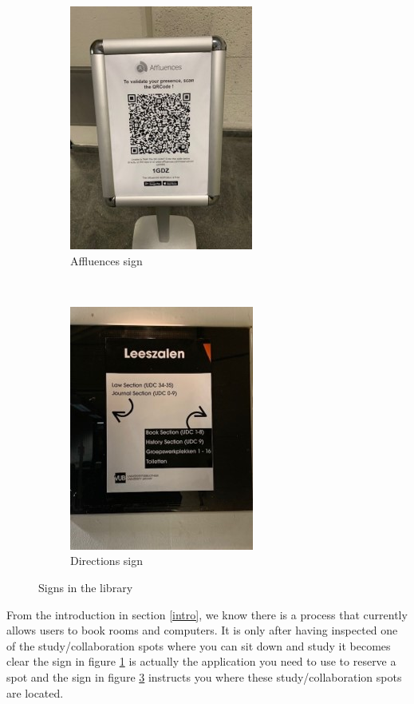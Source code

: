 \documentclass[a4paper, 11pt]{article}
\begin{document}
\begin{figure}[h]
	\centering
	\begin{subfigure}[t]{0.5\textwidth}
		\centering
		\includegraphics[width=0.5\linewidth]{figures/affluences}
		\caption{Affluences sign}
		\label{fig:affluences}
	\end{subfigure}%
	~ 
	\begin{subfigure}[t]{0.5\textwidth}
		\centering
		\includegraphics[width=0.5\linewidth]{figures/directions}
		\caption{Directions sign}
		\label{fig:directions}
	\end{subfigure}
	\caption{Signs in the library}
\end{figure}

From the introduction in section \ref{intro}, we know there is a process that currently allows users to book rooms and computers. It is only after having inspected one of the study/collaboration spots where you can sit down and study it becomes clear the sign in figure \ref{fig:affluences} is actually the application you need to use to reserve a spot and the sign in figure \ref{fig:directions} instructs you where these study/collaboration spots are located.\\
\end{document}
